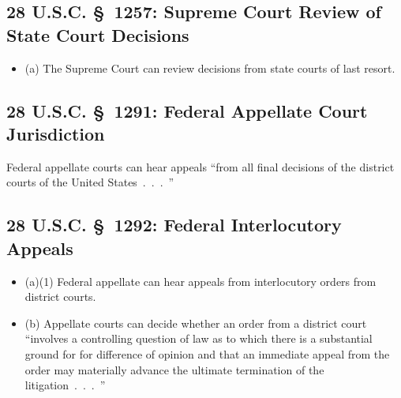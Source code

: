 \subsection{28 U.S.C. \S\ 1257: Supreme Court Review of State Court Decisions}

\begin{itemize}
    \item (a) The Supreme Court can review decisions from state courts of last 
    resort.
\end{itemize}

\subsection{28 U.S.C. \S\ 1291: Federal Appellate Court Jurisdiction}

Federal appellate courts can hear appeals ``from all final decisions of the 
district courts of the United States~.~.~.~''

\subsection{28 U.S.C. \S\ 1292: Federal Interlocutory Appeals}

\begin{itemize}
    \item (a)(1) Federal appellate can hear appeals from interlocutory orders 
    from district courts.
    \item (b) Appellate courts can decide whether an order from a district 
    court ``involves a controlling question of law as to which there is a 
    substantial ground for for difference of opinion and that an immediate 
    appeal from the order may materially advance the ultimate termination of 
    the litigation~.~.~.~''
\end{itemize}
